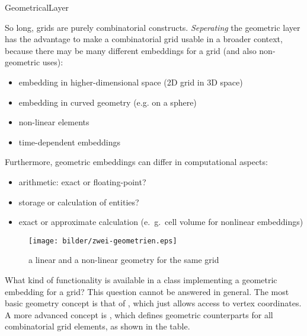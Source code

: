 
\begin{Label}{GeometricalLayer}
\end{Label}


So long, grids are purely combinatorial constructs. 
{\em Seperating\/} the geometric
layer has the advantage to make a combinatorial grid usable in a 
broader context, because there may be many different embeddings for
a grid (and also non-geometric uses):

\begin{itemize}
\item  embedding in higher-dimensional space (2D grid in 3D space)
\item embedding in curved geometry (e.g. on a sphere)
\item non-linear elements
\item time-dependent embeddings 
\end{itemize}

Furthermore, geometric embeddings can differ in computational aspects:
\begin{itemize}
\item arithmetic: exact or floating-point?
\item storage or calculation of entities?
\item exact or approximate calculation (e.\ g.\ cell volume
  for nonlinear embeddings)
\end{itemize}

   \begin{figure}[h]
     \begin{center}
       \T\texttt{[image: bilder/zwei-geometrien.eps]}
       \W{}
      \caption{a linear and a non-linear geometry for the same grid}
     \end{center}
   \end{figure}


What kind of functionality is available in a class implementing a 
geometric embedding for a grid?
This question cannot be answered in general.
The most basic geometry concept is that of ,
which just allows access to vertex coordinates.
A more advanced concept is 
,
which defines geometric counterparts for all combinatorial grid elements,
as shown in the table.

